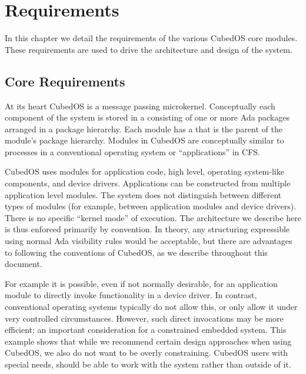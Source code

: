 
\chapter{Requirements}
\label{chapt:requirements}

In this chapter we detail the requirements of the various CubedOS core modules. These
requirements are used to drive the architecture and design of the system. 

\section{Core Requirements}
\label{sec:core-requirements}

At its heart CubedOS is a message passing microkernel. Conceptually each component of the system
is stored in a  consisting of one or more Ada packages arranged in a package
hierarchy. Each module has a  that is the parent of the module's
package hierarchy. Modules in CubedOS are conceptually similar to processes in a conventional
operating system or ``applications'' in CFS.

CubedOS uses modules for application code, high level, operating system-like components, and
device drivers. Applications can be constructed from multiple application level modules. The
system does not distinguish between different types of modules (for example, between application
modules and device drivers). There is no specific ``kernel mode'' of execution. The architecture
we describe here is thus enforced primarily by convention. In theory, any structuring
expressible using normal Ada visibility rules would be acceptable, but there are advantages to
following the conventions of CubedOS, as we describe throughout this document. 

For example it is possible, even if not normally desirable, for an application module to
directly invoke functionality in a device driver. In contrast, conventional operating systems
typically do not allow this, or only allow it under very controlled circumstances. However, such
direct invocations may be more efficient; an important consideration for a constrained embedded
system. This example shows that while we recommend certain design approaches when using CubedOS,
we also do not want to be overly constraining. CubedOS users with special needs, should be able
to work with the system rather than outside of it.


